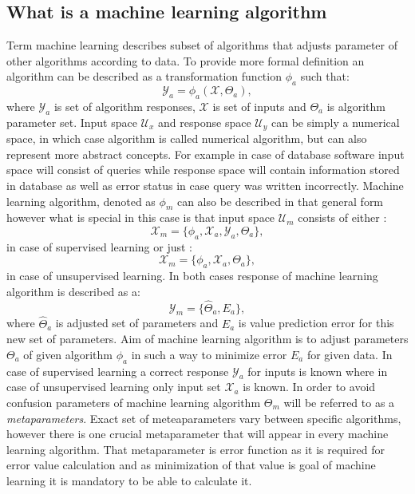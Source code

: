 \subsection{What is a machine learning algorithm}
Term machine learning describes subset of algorithms that adjusts parameter of other algorithms 
according to data. To provide more formal definition an algorithm can be described as a 
transformation function $\phi_{a}$ such that:
\begin{equation}
	\label{equ:algorithm_general}
	\mathcal{Y}_{a} = \phi_{a}(\mathcal{X},\Theta_{a}),
\end{equation}
where $\mathcal{Y}_{a}$ is set of algorithm responses, $\mathcal{X}$ is set of inputs 
and $\Theta_{a}$ is algorithm parameter set.
Input space $\mathcal{U}_{x}$ and response space $\mathcal{U}_{y}$ can be simply a numerical
space, in which case algorithm is called numerical algorithm, but can also represent more 
abstract concepts. For example in case of database software input space will consist of 
queries while response space will contain information stored in database as well as error 
status in case query was written incorrectly.
Machine learning algorithm, denoted as $\phi_{m}$ can also be described in that general form
however what is special in this case is that input space $\mathcal{U}_{m}$ consists of either :
\begin{equation}
	\label{equ:supervised_input}
	\mathcal{X}_{m} = \{\phi_{a}, \mathcal{X}_{a}, \mathcal{Y}_{a}, \Theta_{a} \},
\end{equation}
in case of supervised learning or just :
\begin{equation}
	\label{equ:supervised_input}
	\mathcal{X}_{m} = \{\phi_{a}, \mathcal{X}_{a}, \Theta_{a} \},
\end{equation}
in case of unsupervised learning.
In both cases response of machine learning algorithm is described as a:
\begin{equation}
	\label{equ:ml_response}
	\mathcal{Y}_{m} = \{\hat{\Theta}_{a}, E_{a}\},
\end{equation}
where $\hat{\Theta}_{a}$ is adjusted set of parameters and $E_{a}$ is value prediction 
error for this new set of parameters.
Aim of machine learning algorithm is to adjust parameters $\Theta_{a}$ of given algorithm 
$\phi_{a}$ in such a way to minimize error $E_{a}$ for given data. In case of supervised learning
a correct response $\mathcal{Y}_{a}$ for inputs is known where in case of unsupervised learning
only input set $\mathcal{X}_{a}$ is known. In order to avoid confusion parameters of machine 
learning algorithm $\Theta_{m}$ will be referred to as a \textit{metaparameters}. 
Exact set of meteaparameters vary between specific algorithms, however there is one 
crucial metaparameter that will appear in every machine learning algorithm.
That metaparameter is error function as it is required for error value calculation and as 
minimization of that value is goal of machine learning it is mandatory to be able to calculate it.

